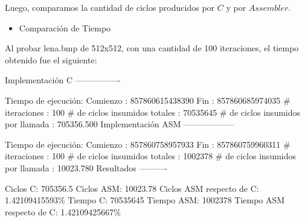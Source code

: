 \documentclass[10pt, a4paper]{article}
\begin{document}
\begin{itemize}
Luego, comparamos la cantidad de ciclos producidos por $C$ y por $Assembler$.\newline
\begin{itemize}
\item{Comparación de Tiempo}
\end{itemize}
Al probar lena.bmp de 512x512, con una cantidad de 100 iteraciones, el tiempo obtenido fue el siguiente:\newline

Implementación C\newline
----------------

Tiempo de ejecución:\newline
  Comienzo                          : 857860615438390\newline
  Fin                               : 857860685974035\newline
  \# iteraciones                     : 100\newline
  \# de ciclos insumidos totales     : 70535645\newline
  \# de ciclos insumidos por llamada : 705356.500\newline
\newline
Implementación ASM\newline
------------------

Tiempo de ejecución:\newline
  Comienzo                          : 857860758957933\newline
  Fin                               : 857860759960311\newline
  \# iteraciones                     : 100\newline
  \# de ciclos insumidos totales     : 1002378\newline
  \# de ciclos insumidos por llamada : 10023.780\newline
\newline
Resultados\newline
----------

Ciclos C:                 705356.5\newline
Ciclos ASM:               10023.78\newline
Ciclos ASM respecto de C: 1.42109415593\% \newline
Tiempo C:                 70535645\newline
Tiempo ASM:               1002378\newline
Tiempo ASM respecto de C: 1.42109425667\% \newline


\end{itemize}
\end{document}

